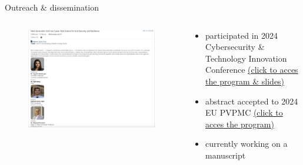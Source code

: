 \documentclass[aspectratio=169,11pt]{beamer}
\begin{document}
\begin{frame}{Outreach \& dissemination}
\begin{columns}
    \begin{column}{0.6\textwidth}
        \begin{figure}
            \centering
            \includegraphics[width=\columnwidth]{./figures/cybercon_program.png}
        \end{figure}
    \end{column}
    \begin{column}{0.4\textwidth}
        \begin{itemize}
            \item participated in 2024 Cybersecurity \& Technology Innovation Conference
            \href{https://www.doecybercon.com/Program/Agenda}{(click to acces the program \& slides)}
            \item abstract accepted to 2024 EU PVPMC
            \href{https://www.sandia.gov/app/uploads/sites/243/dlm_uploads/2024/08/2024-European-PVPMC-Program-V9.pdf}{(click to acces the program)}
            \item currently working on a manuscript
        \end{itemize}
    \end{column}
\end{columns}
\end{frame}
    


	
\end{document}

